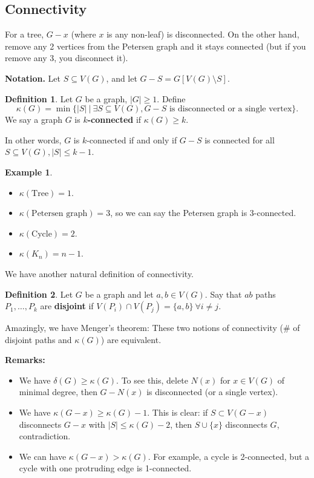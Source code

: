 \documentclass{article}
\theoremstyle{definition}
\newtheorem{example}{Example}[section]
\newtheorem{defn}{Definition}[section]
\begin{document}
\subsection{Connectivity}

For a tree, $G-x$ (where $x$ is any non-leaf) is disconnected. On the other hand, remove any 2 vertices from the Petersen graph and it stays connected (but if you remove any 3, you disconnect it).
\vspace{1mm}

\textbf{Notation.} Let $S \subseteq V(G)$, and let $G - S = G[V(G) \setminus S]$.

\begin{defn}
    Let $G$ be a graph, $|G|\ge 1$. Define $$\kappa(G) = \min \{|S| ~|~ \exists S \subseteq V(G), G-S \text{ is disconnected or a single vertex}\}.$$
    We say a graph $G$ is \textbf{$k$-connected}  if $\kappa(G) \ge k$.
\end{defn}

In other words, $G$ is $k$-connected if and only if $G-S$ is connected for all $ S \subseteq V(G), |S|\le k-1$.

\begin{example}
    \begin{itemize}
        \item $\kappa(\text{Tree})=1$.
        \item $\kappa(\text{Petersen graph}) = 3$, so we can say the Petersen graph is 3-connected.
        \item $\kappa(\text{Cycle}) = 2$.
        \item $\kappa(K_n) = n-1$.
    \end{itemize}
\end{example}

We have another natural definition of connectivity.

\begin{defn}
    Let $G$ be a graph and let $a,b \in V(G)$. Say that $ab$ paths $P_1,\ldots,P_k$ are \textbf{disjoint} if $V(P_i) \cap V(P_j) = \{a,b\} ~\forall i \neq j$.
\end{defn}

Amazingly, we have Menger's theorem: These two notions of connectivity (\# of disjoint paths and $\kappa(G)$) are equivalent.
\vspace{1mm}

\textbf{Remarks:} 
\begin{itemize}
    \item We have $\delta(G)\ge \kappa(G)$. To see this, delete $N(x)$ for $x \in V(G) $ of minimal degree, then $G-N(x)$ is disconnected (or a single vertex).
    \item We have $\kappa(G-x) \ge \kappa(G) - 1$. This is clear: if $S \subset V(G-x)$ disconnects $G-x$ with $|S|\le \kappa(G)-2$, then $S \cup \{x\}$ disconnects $G$, contradiction.
    \item We can have $\kappa(G-x) > \kappa(G)$. For example, a cycle is 2-connected, but a cycle with one protruding edge is 1-connected.
\end{itemize}
\end{document}
